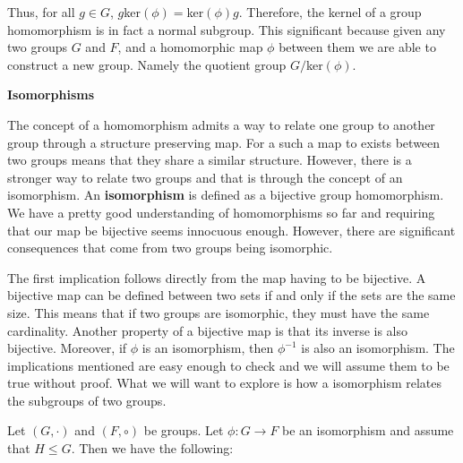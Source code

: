 \documentclass[12pt, a4paper]{article}
\begin{document}
\vspace{4mm}

    Thus, for all $g\in G$, $g$ker$(\phi)=$ker$(\phi)g$. Therefore, the kernel of a group homomorphism is in fact a normal subgroup. This significant because given any two groups $G$ and $F$, and a homomorphic map $\phi$ between them we are able to construct a new group. Namely the quotient group $G/$ker$(\phi)$.
    
\begin{flushleft}
    
    \large{\textbf{Isomorphisms}}
    
\end{flushleft}

    The concept of a homomorphism admits a way to relate one group to another group through a structure preserving map. For a such a map to exists between two groups means that they share a similar structure. However, there is a stronger way to relate two groups and that is through the concept of an isomorphism. An \textbf{isomorphism} is defined as a bijective group homomorphism. We have a pretty good understanding of homomorphisms so far and requiring that our map be bijective seems innocuous enough. However, there are significant consequences that come from two groups being isomorphic.\par
    
\vspace{4mm} 

    The first implication follows directly from the map having to be bijective. A bijective map can be defined between two sets if and only if the sets are the same size. This means that if two groups are isomorphic, they must have the same cardinality. Another property of a bijective map is that its inverse is also bijective. Moreover, if $\phi$ is an isomorphism, then $\phi^{-1}$ is also an isomorphism. The implications mentioned are easy enough to check and we will assume them to be true without proof. What we will want to explore is how a isomorphism relates the subgroups of two groups.\par
    
\newpage

    Let $(G,\cdot)$ and $(F,\circ)$ be groups. Let $\phi\colon G\rightarrow F$ be an isomorphism and assume that $H\leqslant G$. Then we have the following:
    
\vspace{4mm}
\end{document}
